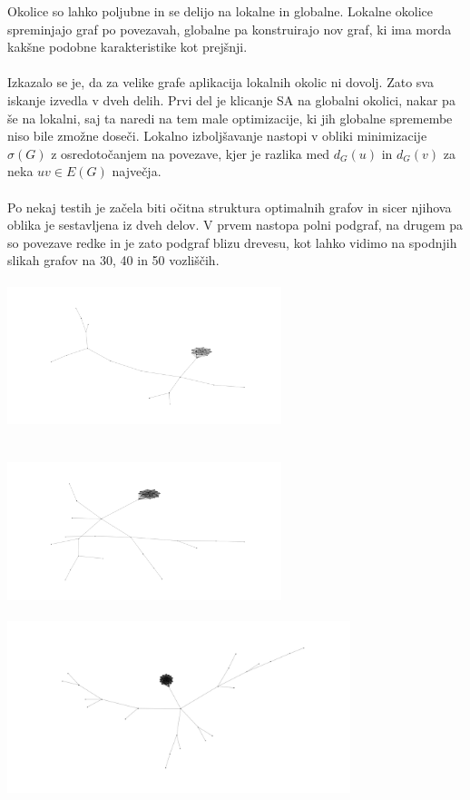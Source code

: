 \documentclass[ letterpaper, titlepage, fleqn]{article}
\begin{document}
Okolice so lahko poljubne in se delijo na lokalne in globalne.
Lokalne okolice spreminjajo graf po povezavah, globalne pa
konstruirajo nov graf, ki ima morda kakšne podobne karakteristike kot prejšnji.
\\\\
Izkazalo se je, da za velike grafe aplikacija lokalnih okolic ni dovolj. Zato
sva iskanje izvedla v dveh delih. Prvi del je klicanje SA na globalni okolici, nakar
pa še na lokalni, saj ta naredi na tem male optimizacije, ki jih globalne spremembe 
niso bile zmožne doseči.
Lokalno izboljšavanje nastopi v obliki minimizacije $\sigma(G)$ z osredotočanjem na
povezave, kjer je razlika med $d_G(u)$ in $d_G(v)$ za neka $uv \in E(G)$ največja.
\\\\
Po nekaj testih je začela biti očitna struktura optimalnih grafov in sicer
njihova oblika je sestavljena iz dveh delov. V prvem nastopa polni podgraf, 
na drugem pa so povezave redke in je zato podgraf blizu drevesu, kot lahko 
vidimo na spodnjih slikah grafov na 30, 40 in 50 vozliščih. \\
\includegraphics[width=8cm, height=5cm]{graphics/opt_sample_30.png}  
\includegraphics[width=8cm, height=5cm]{graphics/opt_sample_40.png}  \\
\includegraphics[width=\textwidth, height=5cm]{graphics/opt_sample_50.png} \\
\end{document}
